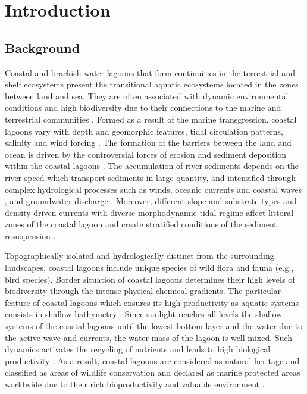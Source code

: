 \documentclass[jmse,article,submit,pdftex,moreauthors]{Definitions/mdpi}
\begin{document}
\section{Introduction}

\subsection{Background}
Coastal and brackish water lagoons that form continuities in the terrestrial and shelf ecosystems present the transitional aquatic ecosystems located in the zones between land and sea. They are often associated with dynamic environmental conditions and high biodiversity due to their connections to the marine and terrestrial communities \cite{PEREZRUZAFA2019253}. Formed as a result of the marine transgression, coastal lagoons vary with depth and geomorphic features, tidal circulation patterns, salinity and wind forcing \cite{KJERFVE198663}. The formation of the barriers between the land and ocean is driven by the controversial forces of erosion and sediment deposition within the coastal lagoons \cite{BOYD1992139}. The accumulation of river sediments depends on the river speed which transport sediments in large quantity, and intensified through complex hydrological processes such as winds, oceanic currents and coastal waves \cite{KUMAR2016155}, and groundwater discharge \cite{DANISH2020103816}. Moreover, different slope and substrate types and density-driven currents with diverse morphodynamic tidal regime affect littoral zones of the coastal lagoon and create stratified conditions of the sediment resuspension \cite{BORTOLIN2020105782,Larson2012}. 

Topographically isolated and hydrologically distinct from the surrounding landscapes, coastal lagoons include unique species of wild flora and fauna (e.g., bird species). Border situation of coastal lagoons determines their high levels of biodiversity through the intense physical-chemical gradients. The particular feature of coastal lagoons which ensures its high productivity as aquatic systems consists in shallow bathymetry \cite{PEREZRUZAFA2024171264}. Since sunlight reaches all levels the shallow  systems of the coastal lagoons until the lowest bottom layer and the water due to the active wave and currents, the water mass of the lagoon is well mixed. Such dynamics activates the recycling of nutrients and leads to high biological productivity \cite{Kennish2016}. As a result, coastal lagoons are considered as natural heritage and classified as areas of wildlife conservation \cite{HERBERT2020631,Nazneen2022} and declared as marine protected areas worldwide due to their rich bioproductivity and valuable environment . 
\end{document}
